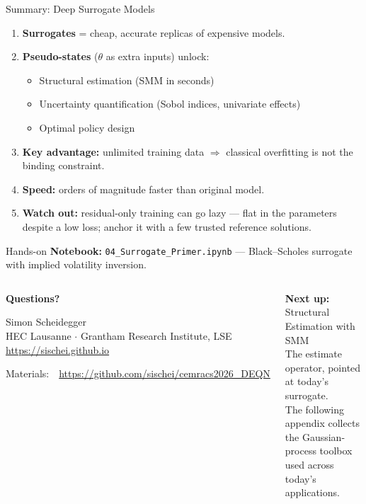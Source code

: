 \documentclass[aspectratio=169,11pt]{beamer}
\newcommand{\emphc}[1]{\textcolor{harvardcrimson}{#1}}
\begin{document}
\begin{frame}{Summary: Deep Surrogate Models}
\begin{enumerate}
  \item \textbf{Surrogates} = cheap, accurate replicas of expensive models.
  \item \textbf{Pseudo-states} ($\theta$ as extra inputs) unlock:
  \begin{itemize}
    \item Structural estimation (SMM in seconds)
    \item Uncertainty quantification (Sobol indices, univariate effects)
    \item Optimal policy design
  \end{itemize}
  \item \textbf{Key advantage:} unlimited training data $\Rightarrow$ classical overfitting is not the binding constraint.
  \item \textbf{Speed:} orders of magnitude faster than original model.
  \item \textbf{Watch out:} residual-only training can go \emphc{lazy} --- flat in the parameters despite a low loss; anchor it with a few trusted reference solutions.
\end{enumerate}

\vspace{0.3cm}
\begin{block}{Hands-on}
\textbf{Notebook:} \texttt{04\_Surrogate\_Primer.ipynb} --- Black--Scholes surrogate with implied volatility inversion.
\end{block}
\end{frame}

\begin{frame}{}
\begin{columns}[c]
\begin{center}
{\Huge \textcolor{uzhblue}{\textbf{Questions?}}}

\vspace{1.0cm}
{\large Simon Scheidegger}\\[4pt]
{\small HEC Lausanne $\cdot$ Grantham Research Institute, LSE}\\[4pt]
\url{https://sischei.github.io}

\vspace{0.6cm}
{\small Materials:~~\url{https://github.com/sischei/cemracs2026_DEQN}}
\end{center}

\begin{center}
\textbf{Next up:}\\[6pt]
{\large Structural Estimation with SMM}\\[10pt]
{\small The \emphc{estimate} operator, pointed at today's surrogate.}\\[12pt]
{\footnotesize The following appendix collects the Gaussian-process toolbox used across today's applications.}
\end{center}
\end{columns}
\end{frame}
\end{document}

